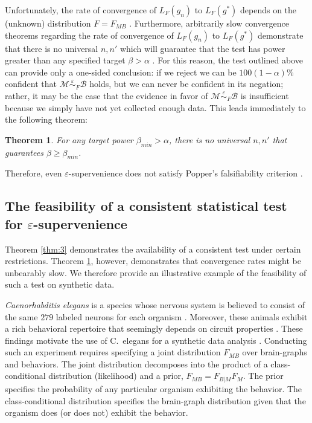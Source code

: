 \documentclass{article}
\newcommand{\mB}{\mathcal{B}}
\newcommand{\mM}{\mathcal{M}}
\newcommand{\eps}{\varepsilon}
\newcommand{\MeB}{\mM \overset{\varepsilon}{{\sim}}_{F} \mB}
\providecommand{\tr}[1]{\textcolor{black}{#1}}
\newtheorem{thm}{Theorem}
\begin{document}
Unfortunately, the rate of convergence of $L_{F}(g_n)$ to $L_{F}(g^*)$ depends on the (unknown) distribution $F=F_{MB}$ \cite{DGL96}. Furthermore, arbitrarily slow convergence theorems regarding the rate of convergence of $L_{F}(g_n)$ to $L_{F}(g^*)$ demonstrate that there is no universal $n,n'$ which will guarantee that the test has power greater than any specified target $\beta > \alpha$ \cite{Devroye83}. For this reason, the test outlined above can provide only a one-sided conclusion: if we reject we can be $100(1-\alpha)$\% confident that $\MeB$ holds, but we can never be confident in its negation; rather, it may be the case that the evidence in favor of $\MeB$ is insufficient 
because we simply have not yet collected enough data. 
This leads immediately to the following theorem:
\begin{thm} \label{thm:4}
For any target power $\beta_{min} > \alpha$, there is no universal $n,n'$ that guarantees $\beta \geq \beta_{min}$.
\end{thm}

Therefore, even $\eps$-supervenience does not satisfy Popper's falsifiability criterion \cite{Popper1959}.


\subsection*{The feasibility of a consistent statistical test for $\eps$-supervenience} %


Theorem \ref{thm:3} demonstrates the availability of a consistent test under certain restrictions.  Theorem \ref{thm:4}, however, demonstrates that convergence rates might be unbearably slow.  We therefore provide an illustrative example of the feasibility of such a test on synthetic data.

{\it Caenorhabditis elegans} is a species whose nervous system is believed to consist of the same $279$ labeled neurons for each organism \cite{Durbin87}. Moreover, these animals exhibit a rich behavioral repertoire that seemingly depends on circuit properties \cite{deBonoMaricq05}.  These findings motivate the use of C.~elegans for a synthetic data analysis \cite{GelmanShalizi11}.  Conducting such an experiment requires specifying a joint distribution $F_{MB}$ over brain-graphs and behaviors.  The joint distribution decomposes into the product of a class-conditional distribution (likelihood) and a prior, $F_{MB}=F_{B|M}F_M$. The prior  specifies the probability of any particular organism exhibiting the behavior.  The class-conditional distribution specifies the brain-graph distribution given that the organism does (or does not) exhibit the behavior. 
\end{document}
